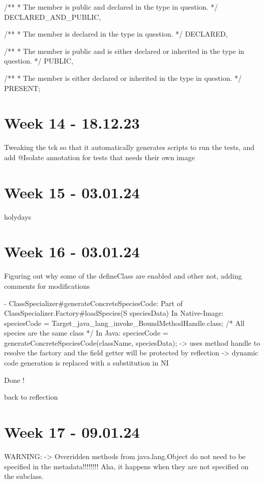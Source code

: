         /**
         * The member is public and declared in the type in question.
         */
        DECLARED\_AND\_PUBLIC,

        /**
         * The member is declared in the type in question.
         */
        DECLARED,

        /**
         * The member is public and is either declared or inherited in the type in question.
         */
        PUBLIC,

        /**
         * The member is either declared or inherited in the type in question.
         */
        PRESENT;

\section{Week 14 - 18.12.23}
Tweaking the tck so that it automatically generates scripts to run the tests, and add @Isolate annotation for tests that needs their own image

\section{Week 15 - 03.01.24}
holydays
\section{Week 16 - 03.01.24}
Figuring out why some of the defineClass are enabled and other not, adding comments for modifications

- ClassSpecializer#generateConcreteSpeciesCode:
Part of ClassSpecializer.Factory#loadSpecies(S speciesData)
In Native-Image: speciesCode = Target_java_lang_invoke_BoundMethodHandle.class; /* All species are the same class */
In Java: speciesCode = generateConcreteSpeciesCode(className, speciesData); -> uses method handle to resolve the factory and the field getter
will be protected by reflection
-> dynamic code generation is replaced with a substitution in NI

Done !

back to reflection

\section{Week 17 - 09.01.24}
WARNING:
-> Overridden methods from java.lang.Object do not need to be specified in the metadata!!!!!!!!
Aha, it happens when they are not specified on the subclass.

